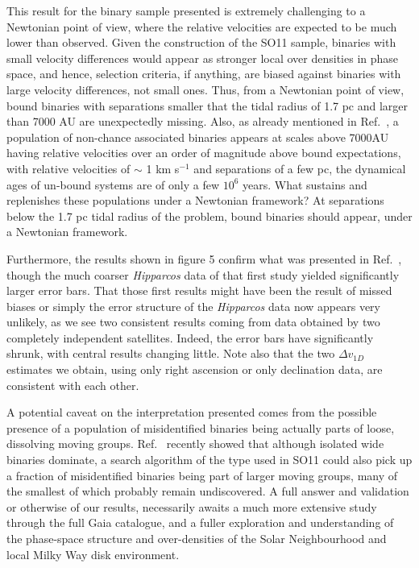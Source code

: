 \documentclass{ws-ijmpd}
\begin{document}
This result for the binary sample presented is extremely challenging to a Newtonian point of view, where the relative
velocities are expected to be much lower than observed. Given the construction of the SO11 sample, binaries with small
velocity differences would appear as stronger local over densities in phase space, and hence, selection criteria, if anything,
are biased against binaries with large velocity differences, not small ones. Thus, from a Newtonian point of view, bound binaries
with separations smaller that the tidal radius of 1.7 pc and larger than 7000 AU are unexpectedly missing. Also, as already
mentioned in Ref.~, a population
of non-chance associated binaries appears at scales above 7000AU having relative velocities over an order of magnitude above
bound expectations, { with relative velocities of $\sim$ 1 km s$^{-1}$ and separations of a few pc, the dynamical ages of
un-bound systems are of only a few $10^6$ years.} What sustains and replenishes these populations under a Newtonian framework?
At separations below the 1.7 pc tidal radius of the problem, bound binaries should appear, under a Newtonian framework. 


Furthermore, the results shown in figure 5  confirm what was presented in  Ref.~, though
the much coarser {\it Hipparcos} data of that first study yielded significantly larger error bars. That those first
results might have been the result of missed biases or simply the error structure of the {\it Hipparcos} data now appears
very unlikely, as we see two consistent results coming from data obtained by two completely independent satellites. Indeed,
the error bars have significantly shrunk, with central results changing little. Note also that the two $\Delta v_{1D}$
estimates we obtain, using only right ascension or only declination data, are consistent with each other.

A potential caveat on the interpretation presented comes from the possible  presence of a population of misidentified
binaries being actually parts of loose, dissolving moving groups.  Ref.~ recently showed that although isolated
wide binaries dominate, a search algorithm of the type used in SO11 could also pick up a fraction of misidentified
binaries being part of larger moving groups, many of the smallest of which probably remain undiscovered. A full answer
and validation or otherwise of our results, necessarily awaits a much more extensive study through the full Gaia catalogue,
and a fuller exploration and understanding of the phase-space structure and over-densities of the Solar Neighbourhood and
local Milky Way disk environment.
\end{document}
